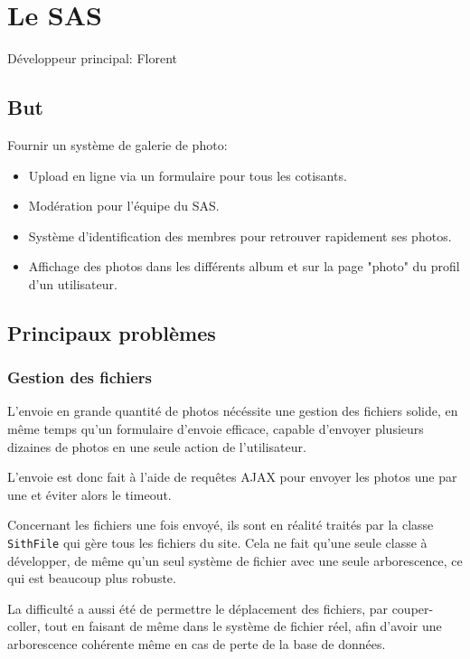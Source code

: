 \documentclass[a4paper]{report}
\begin{document}
\chapter{Le SAS}
\label{sec:le_sas}
\par Développeur principal: Florent

\section{But}
\label{sub:but}
\par Fournir un système de galerie de photo:
\begin{itemize}
    \item Upload en ligne via un formulaire pour tous les cotisants.
    \item Modération pour l'équipe du SAS.
    \item Système d'identification des membres pour retrouver rapidement ses photos.
    \item Affichage des photos dans les différents album et sur la page "photo" du profil d'un utilisateur.
\end{itemize}

\section{Principaux problèmes}
\label{sec:principaux_problemes}

\subsection{Gestion des fichiers}
\label{sub:gestion_des_fichiers}
\par L'envoie en grande quantité de photos nécéssite une gestion des fichiers solide, en même temps qu'un formulaire
d'envoie efficace, capable d'envoyer plusieurs dizaines de photos en une seule action de l'utilisateur.

\par L'envoie est donc fait à l'aide de requêtes AJAX pour envoyer les photos une par une et éviter alors le timeout.

\par Concernant les fichiers une fois envoyé, ils sont en réalité traités par la classe \verb#SithFile# qui gère tous
les fichiers du site. Cela ne fait qu'une seule classe à développer, de même qu'un seul système de fichier avec une
seule arborescence, ce qui est beaucoup plus robuste.

\par La difficulté a aussi été de permettre le déplacement des fichiers, par couper-coller, tout en faisant de même dans
le système de fichier réel, afin d'avoir une arborescence cohérente même en cas de perte de la base de données.
\end{document}
